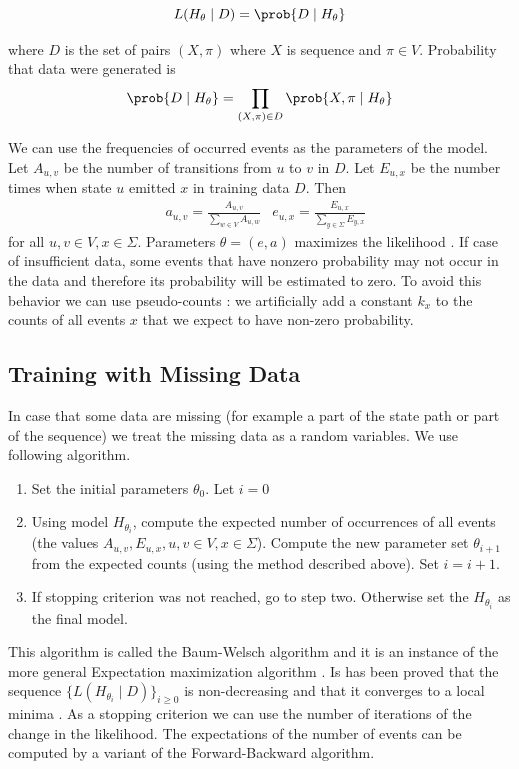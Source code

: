 \[L(H_\theta\mid D)=\prob{D\mid H_\theta}\]

where $D$ is the set of pairs $(X,\pi)$ where $X$ is sequence and $\pi\in
V$. Probability that data
were generated is
\[
\prob{D\mid H_\theta} = \prod_{(X,\pi)\in D}\prob{X,\pi\mid H_\theta}
\]


We can use the frequencies of occurred events as the parameters of the model.
Let $A_{u,v}$ be the number of transitions from $u$ to $v$ in $D$.
Let $E_{u,x}$ be the number times when state $u$ emitted $x$ in training data
$D$.
Then 
\begin{align*}
&a_{u,v}=\frac{A_{u,v}}{\sum_{w\in V}A_{u,w}}
&e_{u,x}=\frac{E_{u,x}}{\sum_{y\in\Sigma}E_{y,x}}
\end{align*}
for all $u,v\in V, x\in\Sigma$. Parameters $\theta=(e,a)$ maximizes the likelihood
\cite{Durbin1998}. If case of insufficient data, some events that have
nonzero probability may not occur in the data and therefore its probability will be
estimated to zero. To avoid this behavior we can use pseudo-counts
\cite{Durbin1998}: we artificially add a constant $k_x$ to the counts of all
events $x$ that we expect to have non-zero probability.

\subsection{Training with Missing Data} 
In case that some data are missing (for example a part
of the state path or part of the sequence) we treat the missing data as a random
variables. We use following algorithm. 
\begin{enumerate}
\item  Set the initial parameters $\theta_0$. Let $i=0$
\item  Using model $H_{\theta_i}$, compute the expected number of occurrences of
all events (the values $A_{u,v}, E_{u,x}, u,v\in V,x\in\Sigma$). Compute the new
parameter set $\theta_{i+1}$ from the expected counts (using the method
described above). Set $i=i+1$.
\item If stopping criterion was not reached, go to step two. Otherwise 
set the $H_{\theta_{i}}$ as the final model.
\end{enumerate}
This algorithm is called the Baum-Welsch algorithm and it is an instance of the
more general Expectation maximization algorithm \cite{Durbin1998}. Is has been
proved that the sequence $\{L(H_{\theta_i}\mid D)\}_{i\geq 0}$ is non-decreasing and
that it converges to a local minima \cite{Durbin1998}. As a stopping criterion
we can use the number of iterations of the change in the likelihood.
 The expectations of the number of events can be
computed by a variant of the Forward-Backward algorithm.

